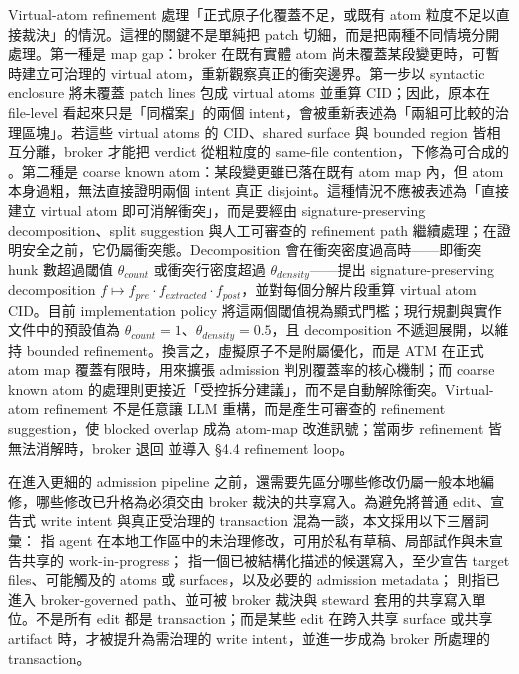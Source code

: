 \documentclass[a4paper,fontset=none]{ctexart}
\begin{document}
Virtual-atom refinement 處理「正式原子化覆蓋不足，或既有 atom 粒度不足以直接裁決」的情況。這裡的關鍵不是單純把 patch 切細，而是把兩種不同情境分開處理。第一種是 map gap：broker 在既有實體 atom 尚未覆蓋某段變更時，可暫時建立可治理的 virtual atom，重新觀察真正的衝突邊界。第一步以 syntactic enclosure 將未覆蓋 patch lines 包成 virtual atoms 並重算 CID；因此，原本在 file-level 看起來只是「同檔案」的兩個 intent，會被重新表述為「兩組可比較的治理區塊」。若這些 virtual atoms 的 CID、shared surface 與 bounded region 皆相互分離，broker 才能把 verdict 從粗粒度的 same-file contention，下修為可合成的 \texttt{}。第二種是 coarse known atom：某段變更雖已落在既有 atom map 內，但 atom 本身過粗，無法直接證明兩個 intent 真正 disjoint。這種情況不應被表述為「直接建立 virtual atom 即可消解衝突」，而是要經由 signature-preserving decomposition、split suggestion 與人工可審查的 refinement path 繼續處理；在證明安全之前，它仍屬衝突態。Decomposition 會在衝突密度過高時------即衝突 hunk 數超過閾值 $\theta_{count}$ 或衝突行密度超過 $\theta_{density}$------提出 signature-preserving decomposition $f \mapsto f_{pre} \cdot f_{extracted} \cdot f_{post}$，並對每個分解片段重算 virtual atom CID。目前 implementation policy 將這兩個閾值視為顯式門檻；現行規劃與實作文件中的預設值為 $\theta_{count}=1$、$\theta_{density}=0.5$，且 decomposition 不遞迴展開，以維持 bounded refinement。換言之，虛擬原子不是附屬優化，而是 ATM 在正式 atom map 覆蓋有限時，用來擴張 admission 判別覆蓋率的核心機制；而 coarse known atom 的處理則更接近「受控拆分建議」，而不是自動解除衝突。Virtual-atom refinement 不是任意讓 LLM 重構，而是產生可審查的 refinement suggestion，使 blocked overlap 成為 atom-map 改進訊號；當兩步 refinement 皆無法消解時，broker 退回 \texttt{} 並導入 §4.4 refinement loop。

在進入更細的 admission pipeline 之前，還需要先區分哪些修改仍屬一般本地編修，哪些修改已升格為必須交由 broker 裁決的共享寫入。為避免將普通 edit、宣告式 write intent 與真正受治理的 transaction 混為一談，本文採用以下三層詞彙：\texttt{} 指 agent 在本地工作區中的未治理修改，可用於私有草稿、局部試作與未宣告共享的 work-in-progress；\texttt{} 指一個已被結構化描述的候選寫入，至少宣告 target files、可能觸及的 atoms 或 surfaces，以及必要的 admission metadata；\texttt{} 則指已進入 broker-governed path、並可被 broker 裁決與 steward 套用的共享寫入單位。不是所有 edit 都是 transaction；而是某些 edit 在跨入共享 surface 或共享 artifact 時，才被提升為需治理的 write intent，並進一步成為 broker 所處理的 transaction。
\end{document}
